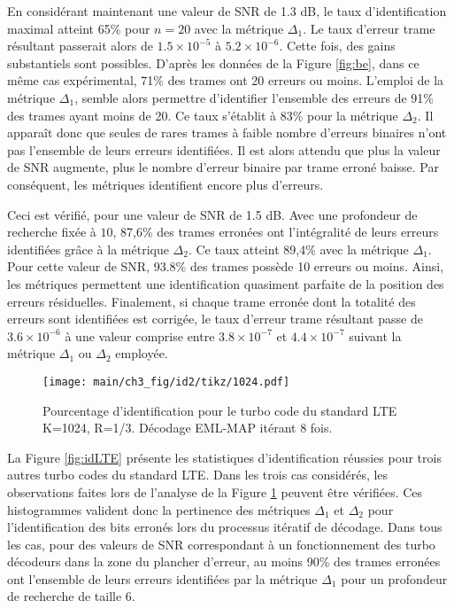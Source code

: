 En considérant maintenant une valeur de SNR de 1.3 dB, le taux d'identification maximal atteint 65\% pour $n=20$ avec la 
métrique $\Delta_1$. Le taux d'erreur trame résultant passerait alors de 
$1.5\times 10^{-5}$ à $5.2\times 10^{-6}$. Cette fois, des gains substantiels sont possibles. D'après les données de la 
Figure \ref{fig:be}, dans ce même cas expérimental, 71\% des trames ont 20 erreurs ou moins. 
L'emploi de la métrique $\Delta_1$, semble alors permettre d'identifier l'ensemble des erreurs de 91\% des trames ayant 
moins de 20. Ce taux s'établit à 83\% pour la métrique $\Delta_2$. 
Il apparaît donc que seules de rares trames à faible nombre d'erreurs binaires n'ont pas l'ensemble de leurs erreurs
identifiées. Il est alors attendu que plus la valeur de SNR augmente, plus le nombre d'erreur binaire par trame erroné 
baisse. Par conséquent, les métriques identifient encore plus d'erreurs.

Ceci est vérifié, pour une valeur de SNR de 1.5 dB. Avec une profondeur de recherche fixée à $10$, 87,6\% des 
trames erronées ont l'intégralité de leurs erreurs identifiées grâce à la métrique $\Delta_2$. Ce taux atteint 89,4\% avec 
la métrique $\Delta_1$. Pour cette valeur de SNR, 93.8\% des trames possède 10 erreurs ou moins. Ainsi, les métriques 
permettent une identification quasiment parfaite de la position des erreurs résiduelles. Finalement, si chaque trame 
erronée dont la totalité des erreurs sont identifiées est corrigée, le taux d'erreur trame résultant passe de 
$3.6\times 10^{-6}$ à une valeur comprise entre $3.8\times 10^{-7}$ et $4.4\times 10^{-7}$ suivant la métrique $\Delta_1$ 
ou $\Delta_2$ employée.

\begin{figure}[!htb]
	\centering
	\texttt{[image: main/ch3\_fig/id2/tikz/1024.pdf]}
	\caption{Pourcentage d'identification pour le turbo code du standard LTE K=1024, R=1/3.
	Décodage EML-MAP itérant 8 fois. \label{fig:id1024}}
\end{figure}
La Figure \ref{fig:idLTE} présente les statistiques d'identification réussies pour trois autres turbo codes du standard 
LTE. Dans les trois cas considérés, les observations faites lors de l'analyse de la Figure \ref{fig:id1024} peuvent être 
vérifiées. Ces histogrammes valident donc la pertinence des métriques $\Delta_1$ et $\Delta_2$ pour l'identification des bits 
erronés lors du processus itératif de décodage. Dans tous les cas, pour des valeurs de SNR correspondant à un fonctionnement des 
turbo décodeurs dans la zone du plancher d'erreur, au moins 90\% des trames erronées ont l'ensemble de leurs erreurs 
identifiées par la métrique $\Delta_1$ pour un profondeur de recherche de taille 6.

